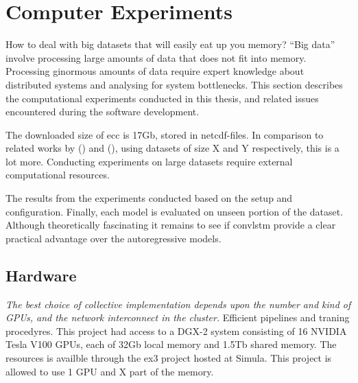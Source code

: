 \chapter{Computer Experiments} \label{ch:computer_experiments}
How to deal with big datasets that will easily eat up you memory? ``Big data'' involve processing large amounts of data that does not fit into memory. Processing ginormous amounts of data require expert knowledge about distributed systems and analysing for system bottlenecks. This section describes the computational experiments conducted in this thesis, and related issues encountered during the software development. 

The downloaded size of \acrshort{ecc} is 17Gb, stored in \acrshort{netcdf}-files. 
In comparison to related works by \citeauthor{precip_nowcasting} (\citeyear{precip_nowcasting}) and  (\citeyear{SunAirLSTM}), using datasets of size X and Y respectively, this is a lot more.
Conducting experiments on large datasets require external computational resources. %

The results from the experiments conducted based on the setup and configuration. %
Finally, each model is evaluated on unseen portion of the dataset. Although theoretically fascinating it remains to see if \acrshort{convlstm} provide a clear practical advantage over the autoregressive models.

\section{Hardware}
\textit{The best choice of collective implementation depends upon the number and kind of GPUs, and the network interconnect in the cluster.} Efficient pipelines and traning procedyres. This project had access to a DGX-2 system consisting of 16 NVIDIA Tesla V100 GPUs, each of 32Gb local memory and 1.5Tb shared memory. The resources is availble through the \acrfull{ex3} project hosted at Simula. This project is allowed to use 1 GPU and X part of the memory. 


